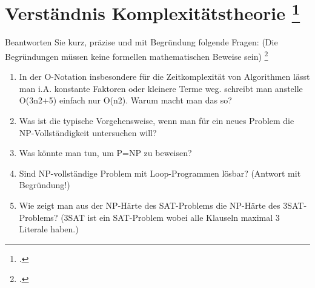 \documentclass{lehramt-informatik-aufgabe}
\begin{document}
\section{Verständnis Komplexitätstheorie
\footcite{66115:2016:03}}

Beantworten Sie kurz, präzise und mit Begründung folgende Fragen: (Die
Begründungen müssen keine formellen mathematischen Beweise sein)
\footcite[Aufgabe 15: StEx F2016 T2 A3, StEx H2017 T1 A3]{theo:ab:4}

\begin{enumerate}


\item In der O-Notation insbesondere für die Zeitkomplexität von
Algorithmen lässt man i.A. konstante Faktoren oder kleinere Terme weg.
\ZB schreibt man anstelle O(3n2+5) einfach nur O(n2). Warum macht man
das so?


\item Was ist die typische Vorgehensweise, wenn man für ein neues
Problem die NP-Vollständigkeit untersuchen will?


\item Was könnte man tun, um P=NP zu beweisen?

\item Sind NP-vollständige Problem mit Loop-Programmen lösbar? (Antwort
mit Begründung!)


\item Wie zeigt man aus der NP-Härte des SAT-Problems die NP-Härte des
3SAT-Problems? (3SAT ist ein SAT-Problem wobei alle Klauseln maximal 3
Literale haben.)

\end{enumerate}
\end{document}
